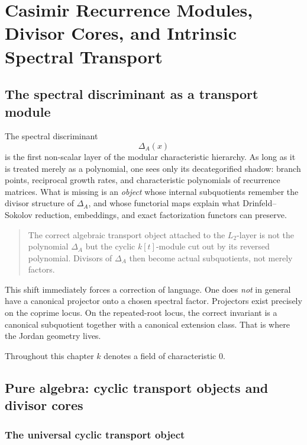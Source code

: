

\chapter{Casimir Recurrence Modules, Divisor Cores, and Intrinsic Spectral Transport}
\label{chap:casimir-divisor}

\section{The spectral discriminant as a transport module}

The spectral discriminant
\[
\Delta_A(x)
\]
is the first non-scalar layer of the modular characteristic hierarchy. As long as it is treated
merely as a polynomial, one sees only its decategorified shadow: branch points, reciprocal
growth rates, and characteristic polynomials of recurrence matrices.
What is missing is an \emph{object} whose internal subquotients remember the divisor structure of
\(\Delta_A\), and whose functorial maps explain what Drinfeld--Sokolov reduction, embeddings,
and exact factorization functors can preserve.

\begin{quote}
The correct algebraic transport object attached to the \(L_2\)-layer is not the polynomial
\(\Delta_A\) but the cyclic \(k[t]\)-module cut out by its reversed polynomial.
Divisors of \(\Delta_A\) then become actual subquotients, not merely factors.
\end{quote}

This shift immediately forces a correction of language.
One does \emph{not} in general have a canonical projector onto a chosen spectral factor.
Projectors exist precisely on the coprime locus.
On the repeated-root locus, the correct invariant is a canonical
subquotient together with a canonical extension class.
That is where the Jordan geometry lives.

Throughout this chapter \(k\) denotes a field of characteristic \(0\).

\section{Pure algebra: cyclic transport objects and divisor cores}

\subsection{The universal cyclic transport object}

